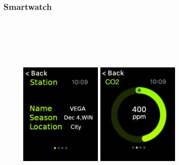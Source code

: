 \documentclass[12pt]{article} %
\begin{document}
\subsubsection{Smartwatch}
\begin{figure}[H]
  \centering
  \includegraphics[width=4cm,height=10cm,keepaspectratio]{img/STATIONAW.png}
  \hspace{0.05\textwidth}
  \includegraphics[width=4cm,height=10cm,keepaspectratio]{img/CO2AW.png}
  \hspace{0.05\textwidth}

\end{figure}
\end{document}
